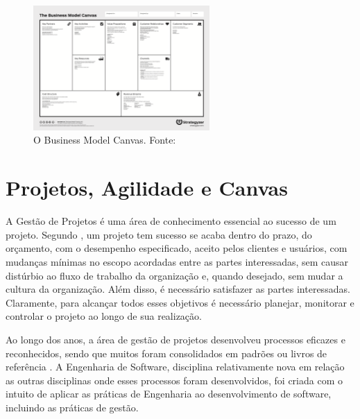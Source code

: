 \documentclass{article}
\newcommand{\othersize}{0.6\textwidth}
\begin{document}
\begin{figure}
    \centering
    \includegraphics[width=\othersize]{imagens/BMC.png}
    \caption{O Business Model Canvas. Fonte: \citet{osterwalder2010business}}
    \label{fig:bmc}
\end{figure}

\section{Projetos, Agilidade e Canvas}

A Gestão de Projetos é uma área de conhecimento essencial ao sucesso de um projeto. Segundo \citet{kerzner:12ed}, um projeto tem sucesso se 
acaba dentro do prazo, do orçamento, com o desempenho especificado, aceito pelos clientes e usuários, com mudanças mínimas no escopo acordadas entre as partes interessadas, sem causar distúrbio ao fluxo de trabalho da organização e, quando desejado, sem mudar a cultura da organização. Além disso, é necessário satisfazer as partes interessadas\citep{pmbok:6}. Claramente, para alcançar todos esses objetivos é necessário planejar, monitorar e controlar o projeto ao longo de sua realização.

Ao longo dos anos, a área de gestão de projetos desenvolveu processos eficazes e reconhecidos, sendo que muitos foram consolidados em padrões ou livros de referência \citep{pmbok:6,kerzner:12ed}. A Engenharia de Software, disciplina relativamente nova em relação as outras disciplinas onde esses processos foram desenvolvidos, foi criada com o intuito de aplicar as práticas de Engenharia ao desenvolvimento de software, incluindo as práticas de gestão\citep{naur:randell:1968,pressman:2019}.
\end{document}
